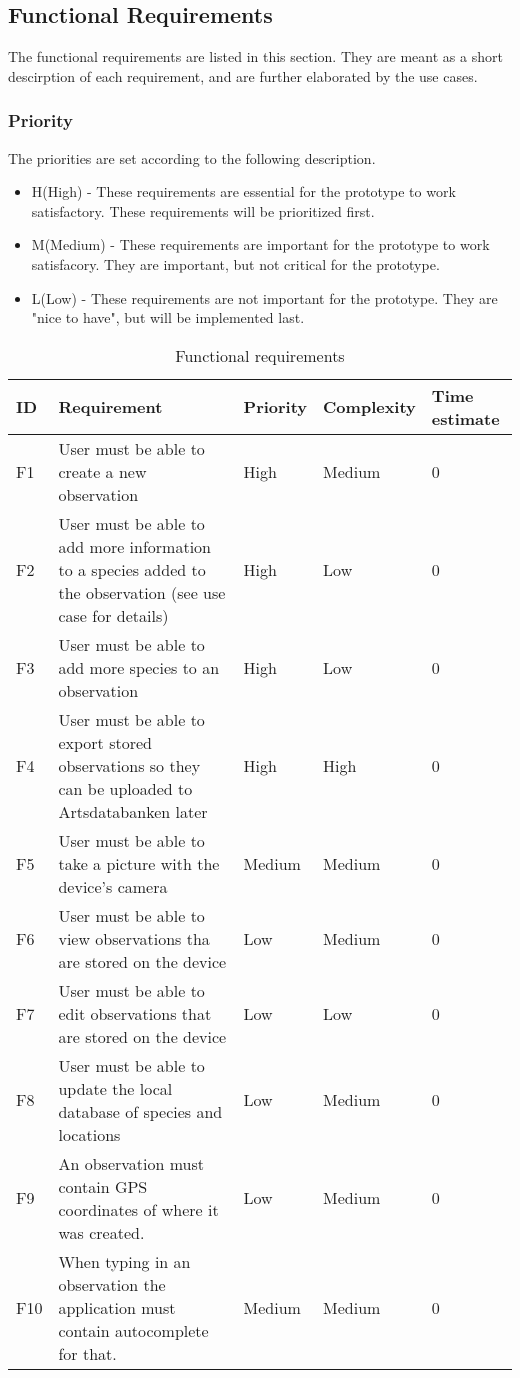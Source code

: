 \subsection{Functional Requirements}
The functional requirements are listed in this section. They are meant as a short descirption of each requirement, and are further elaborated by the use cases.

\subsubsection{Priority}
The priorities are set according to the following description.
\begin{itemize}
	 \item H(High) - These requirements are essential for the prototype to work satisfactory. These requirements will be prioritized first.
	\item M(Medium) - These requirements are important for the prototype to work satisfacory. They are important, but not critical for the prototype.
	\item L(Low) - These requirements are not important for the prototype. They are "nice to have", but will be implemented last.
\end{itemize}

\begin{table}[h!]
	\begin{tabular}[t]{|l|p{}|l|l|p{}|}\hline
	\bf ID&\bf Requirement& \bf Priority& \bf Complexity&\bf Time estimate\\\hline
	F1&User must be able to create a new observation &High&Medium&0\\\hline
	F2&User must be able to add more information to a species added to the observation (see use case for details) 	&High&Low&0\\\hline
	F3&User must be able to add more species to an observation &High&Low&0\\\hline
	F4&User must be able to export stored observations so they can be uploaded to Artsdatabanken later &High&High&0\\\hline
	F5&User must be able to take a picture with the device's camera &Medium&Medium&0\\\hline
	F6&User must be able to view observations tha are stored on the device &Low&Medium&0\\\hline
	F7&User must be able to edit observations that are stored on the device &Low&Low&0\\\hline
	F8&User must be able to update the local database of species and locations &Low&Medium&0\\\hline
	F9&An observation must contain GPS coordinates of where it was created. &Low&Medium&0\\\hline
	F10&When typing in an observation the application must contain autocomplete for that. &Medium&Medium&0\\\hline
	\end{tabular}
	\caption{Functional requirements}
	\label{funcreqs}
\end{table}
